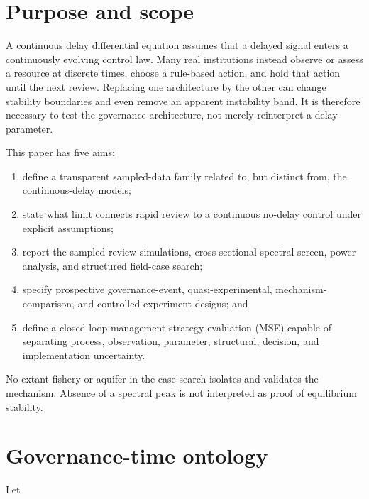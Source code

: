 \documentclass[11pt]{article}
\begin{document}
\section{Purpose and scope}

A continuous delay differential equation assumes that a delayed signal enters a continuously evolving control law. Many real institutions instead observe or assess a resource at discrete times, choose a rule-based action, and hold that action until the next review. Replacing one architecture by the other can change stability boundaries and even remove an apparent instability band. It is therefore necessary to test the governance architecture, not merely reinterpret a delay parameter.

This paper has five aims:

\begin{enumerate}
    \item define a transparent sampled-data family related to, but distinct from, the continuous-delay models;
    \item state what limit connects rapid review to a continuous no-delay control under explicit assumptions;
    \item report the sampled-review simulations, cross-sectional spectral screen, power analysis, and structured field-case search;
    \item specify prospective governance-event, quasi-experimental, mechanism-comparison, and controlled-experiment designs; and
    \item define a closed-loop management strategy evaluation (MSE) capable of separating process, observation, parameter, structural, decision, and implementation uncertainty.
\end{enumerate}

No extant fishery or aquifer in the case search isolates and validates the mechanism. Absence of a spectral peak is not interpreted as proof of equilibrium stability.

\section{Governance-time ontology}

Let
\end{document}

